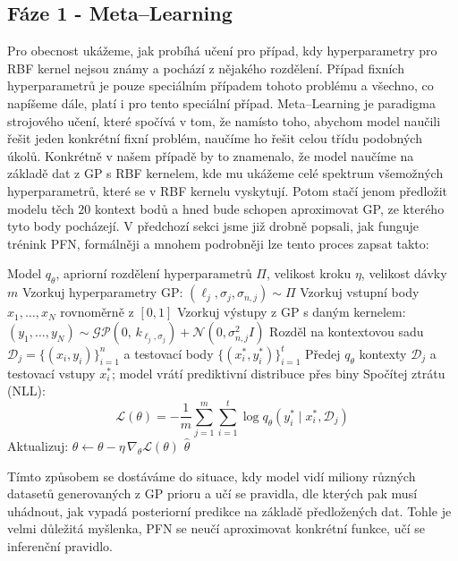 \subsection{Fáze 1 - Meta–Learning}
Pro obecnost ukážeme, jak probíhá učení pro případ, kdy hyperparametry pro RBF kernel nejsou známy a pochází z nějakého rozdělení. 
Případ fixních hyperparametrů je pouze speciálním případem tohoto problému a všechno, co napíšeme dále, platí i pro tento speciální případ. 
Meta–Learning je paradigma strojového učení, které spočívá v tom, že namísto toho, abychom model naučili řešit jeden konkrétní fixní problém, naučíme ho řešit celou třídu podobných úkolů.
Konkrétně v našem případě by to znamenalo, že model naučíme na základě dat z GP s RBF kernelem, kde mu ukážeme celé spektrum všemožných hyperparametrů, které se v RBF kernelu vyskytují. 
Potom stačí jenom předložit modelu těch $20$ kontext bodů a hned bude schopen aproximovat GP, ze kterého tyto body pocházejí. 
V předchozí sekci jsme již drobně popsali, jak funguje trénink PFN, formálněji a mnohem podrobněji lze tento proces zapsat takto:

\clearpage
\begin{algorithm}[!t]
\caption{Meta-trénink sítě PFN na syntetických GP datech}
\label{alg:pfn_training}
\begin{algorithmic}[1]
\Require Model $q_\theta$, apriorní rozdělení hyperparametrů $\Pi$, velikost kroku $\eta$, velikost dávky $m$
        \State Vzorkuj hyperparametry GP: $(\ell_j, \sigma_j, \sigma_{n,j}) \sim \Pi$
        \State Vzorkuj vstupní body $x_1, \ldots, x_N$ rovnoměrně z $[0, 1]$
        \State Vzorkuj výstupy z GP s daným kernelem: $(y_1, \ldots, y_N) \sim \mathcal{GP}(0,\, k_{\ell_j, \sigma_j}) + \mathcal{N}(0, \sigma_{n,j}^2 I)$
        \State Rozděl na kontextovou sadu $\mathcal{D}_j = \{(x_i, y_i)\}_{i=1}^{n}$ a testovací body $\{(x_i^*, y_i^*)\}_{i=1}^{t}$
    \EndFor
    \State Předej $q_\theta$ kontexty $\mathcal{D}_j$ a testovací vstupy $x_i^*$; model vrátí prediktivní distribuce přes biny
    \State Spočítej ztrátu (NLL):
    \[
        \mathcal{L}(\theta) = -\frac{1}{m}\sum_{j=1}^{m}\sum_{i=1}^{t} \log q_{\theta}(y_i^* \mid x_i^*, \mathcal{D}_j)
    \]
    \State Aktualizuj: $\theta \leftarrow \theta - \eta\,\nabla_\theta \mathcal{L}(\theta)$
\EndWhile
\State \Return $\hat{\theta}$
\end{algorithmic}
\end{algorithm}

Tímto způsobem se dostáváme do situace, kdy model vidí miliony různých datasetů generovaných z GP prioru a učí se pravidla, dle kterých pak musí uhádnout, jak vypadá posteriorní predikce na základě předložených dat.
Tohle je velmi důležitá myšlenka, PFN se neučí aproximovat konkrétní funkce, učí se inferenční pravidlo.

